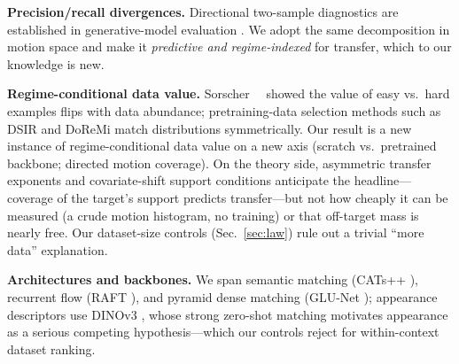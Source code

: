 \noindent\textbf{Precision/recall divergences.}
Directional two-sample diagnostics are established in generative-model
evaluation \cite{sajjadi2018assessing_precision_recall,
kynkaanniemi2019improved_pr,naeem2020reliable,alaa2022faithful}. We adopt the
same decomposition in motion space and make it \emph{predictive and
regime-indexed} for transfer, which to our knowledge is new.

\noindent\textbf{Regime-conditional data value.}
Sorscher~\etal~\cite{sorscher2022beyond} showed the value of easy vs.\ hard
examples flips with data abundance; pretraining-data selection methods such
as DSIR \cite{xie2023data} and DoReMi \cite{xie2023doremi} match
distributions symmetrically. Our result is a new instance of
regime-conditional data value on a new axis (scratch vs.\ pretrained backbone;
directed motion coverage). On the theory side, asymmetric transfer exponents
\cite{hanneke2019value} and covariate-shift support conditions anticipate the
headline---coverage of the target's support predicts transfer---but not how cheaply
it can be measured (a crude motion histogram, no training) or that off-target mass
is nearly free. Our dataset-size controls (Sec.~\ref{sec:law}) rule out a trivial
``more data'' explanation.

\noindent\textbf{Architectures and backbones.}
We span semantic matching (CATs++ \cite{cho2022cats++}), recurrent flow (RAFT
\cite{teed2020raft}), and pyramid dense matching (GLU-Net
\cite{truong2020glunet}); appearance descriptors use DINOv3
\cite{simeoni2025dinov3}, whose strong zero-shot matching
\cite{sd_dino_tale_of_two_features} motivates appearance as a serious
competing hypothesis---which our controls reject for within-context dataset
ranking.

